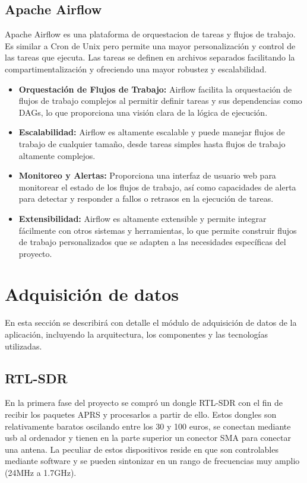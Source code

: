 \subsection{Apache Airflow}
Apache Airflow es una plataforma de orquestacion de tareas y flujos de trabajo. Es similar a Cron de Unix pero permite una mayor personalización y control de las tareas que ejecuta. Las tareas se definen en archivos separados facilitando la compartimentalización y ofreciendo una mayor robustez y escalabilidad.
\begin{itemize}
	\item \textbf{Orquestación de Flujos de Trabajo:} Airflow facilita la orquestación de flujos de trabajo complejos al permitir definir tareas y sus dependencias como DAGs, lo que proporciona una visión clara de la lógica de ejecución.
	\item \textbf{Escalabilidad:} Airflow es altamente escalable y puede manejar flujos de trabajo de cualquier tamaño, desde tareas simples hasta flujos de trabajo altamente complejos.
	\item \textbf{Monitoreo y Alertas:} Proporciona una interfaz de usuario web para monitorear el estado de los flujos de trabajo, así como capacidades de alerta para detectar y responder a fallos o retrasos en la ejecución de tareas.
	\item \textbf{Extensibilidad:} Airflow es altamente extensible y permite integrar fácilmente con otros sistemas y herramientas, lo que permite construir flujos de trabajo personalizados que se adapten a las necesidades específicas del proyecto.
\end{itemize}

\section{Adquisición de datos}
En esta sección se describirá con detalle el módulo de adquisición de datos de la aplicación, incluyendo la arquitectura, los componentes y las tecnologías utilizadas.
\subsection{RTL-SDR}
En la primera fase del proyecto se compró un dongle RTL-SDR con el fin de recibir los paquetes APRS y procesarlos a partir de ello. Estos dongles son relativamente baratos oscilando entre los 30 y 100 euros, se conectan mediante usb al ordenador y tienen en la parte superior un conector SMA para conectar una antena. La peculiar de estos dispositivos reside en que son controlables mediante software y se pueden sintonizar en un rango de frecuencias muy amplio (24MHz a 1.7GHz).

